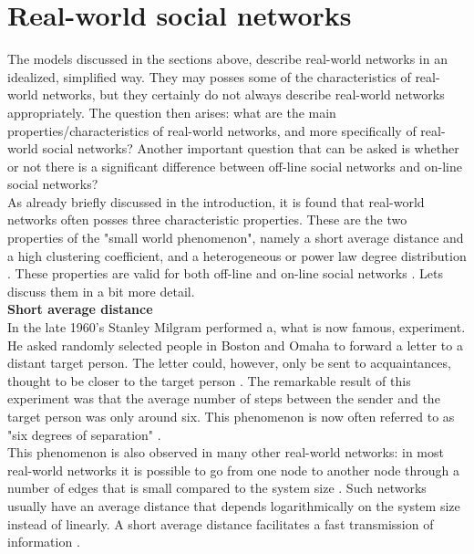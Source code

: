 \documentclass[11 pt , letterpaper , twoside , openright]{book}
\begin{document}

\section{Real-world social networks}
The models discussed in the sections above, describe real-world networks in an idealized, simplified way. They may posses some of the characteristics of real-world networks, but they certainly do not always describe real-world networks appropriately. The question then arises: what are the main properties/characteristics of real-world networks, and more specifically of real-world social networks? Another important question that can be asked is whether or not there is a significant difference between off-line social networks and on-line social networks?\\
\newline
As already briefly discussed in the introduction, it is found that real-world networks often posses three characteristic properties. These are the two properties of the "small world phenomenon", namely a short average distance and a high clustering coefficient, and a heterogeneous or power law degree distribution \cite{RealWorld}. These properties are valid for both off-line and on-line social networks \cite{Zhang2014}. Lets discuss them in a bit more detail.\\
\newline
\newline
\textbf{Short average distance}\\
\newline
In the late 1960's Stanley Milgram performed a, what is now famous, experiment. He asked randomly selected people in Boston and Omaha to forward a letter to a distant target person. The letter could, however, only be sent to acquaintances, thought to be closer to the target person \cite{RealWorld}. The remarkable result of this experiment was that the average number of steps between the sender and the target person was only around six. This phenomenon is now often referred to as "six degrees of separation" \cite{RealWorld}.\\
This phenomenon is also observed in many other real-world networks: in most real-world networks it is possible to go from one node to another node through a number of edges that is small compared to the system size \cite{RealWorld}. Such networks usually have an average distance that depends logarithmically on the system size instead of linearly. A short average distance facilitates a fast transmission of information \cite{Zhang2014}.\\
\end{document}
